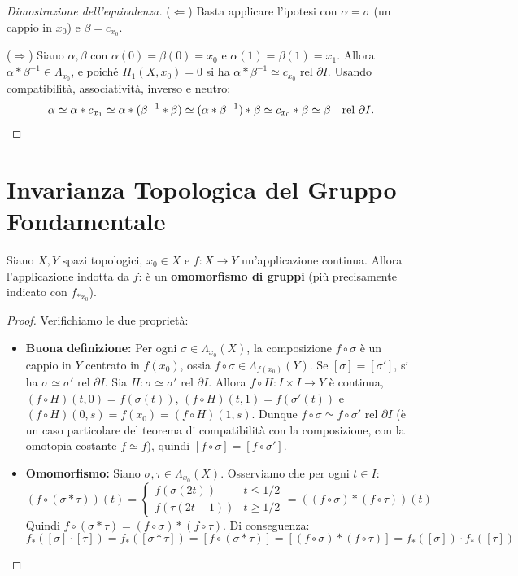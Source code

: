 \begin{proof}[Dimostrazione dell'equivalenza]
($\Leftarrow$) Basta applicare l'ipotesi con $\alpha = \sigma$ (un cappio in $x_0$) e $\beta = c_{x_0}$.

($\Rightarrow$) Siano $\alpha, \beta$ con $\alpha(0) = \beta(0) = x_0$ e $\alpha(1) = \beta(1) = x_1$. Allora $\alpha * \beta^{-1} \in \Lambda_{x_0}$, e poich\'e $\Pi_1(X, x_0) = 0$ si ha $\alpha * \beta^{-1} \simeq c_{x_0}$ rel $\partial I$. Usando compatibilit\`a, associativit\`a, inverso e neutro:
\[
\alpha \simeq \alpha * c_{x_1} \simeq \alpha * (\beta^{-1} * \beta) \simeq (\alpha * \beta^{-1}) * \beta \simeq c_{x_0} * \beta \simeq \beta \quad \text{rel } \partial I. \qedhere
\]
\end{proof}

\section{Invarianza Topologica del Gruppo Fondamentale}

\begin{prop}
Siano $X, Y$ spazi topologici, $x_0 \in X$ e $f: X \to Y$ un'applicazione continua.
Allora l'applicazione indotta da $f$:
è un \textbf{omomorfismo di gruppi} (più precisamente indicato con $f_{*x_0}$).
\end{prop}

\begin{proof}
Verifichiamo le due proprietà:
\begin{itemize}
    \item \textbf{Buona definizione:} Per ogni $\sigma \in \Lambda_{x_0}(X)$, la composizione $f \circ \sigma$ è un cappio in $Y$ centrato in $f(x_0)$, ossia $f \circ \sigma \in \Lambda_{f(x_0)}(Y)$.
    Se $[\sigma] = [\sigma']$, si ha $\sigma \simeq \sigma' \text{ rel } \partial I$. Sia $H: \sigma \simeq \sigma' \text{ rel } \partial I$. Allora $f \circ H: I \times I \to Y$ \`e continua, $(f\circ H)(t,0) = f(\sigma(t))$, $(f \circ H)(t,1) = f(\sigma'(t))$ e $(f \circ H)(0,s) = f(x_0) = (f\circ H)(1,s)$. Dunque $f \circ \sigma \simeq f \circ \sigma' \text{ rel } \partial I$ (\`e un caso particolare del teorema di compatibilit\`a con la composizione, con la omotopia costante $f \simeq f$), quindi $[f \circ \sigma] = [f \circ \sigma']$.

    \item \textbf{Omomorfismo:} Siano $\sigma, \tau \in \Lambda_{x_0}(X)$. Osserviamo che per ogni $t \in I$:
    \[
    (f \circ (\sigma * \tau))(t) = 
    \begin{cases}
        f(\sigma(2t)) & t \leqslant 1/2 \\
        f(\tau(2t-1)) & t \geqslant 1/2
    \end{cases}
    = ((f \circ \sigma) * (f \circ \tau))(t)
    \]
    Quindi $f \circ (\sigma * \tau) = (f \circ \sigma) * (f \circ \tau)$. Di conseguenza:
    \[
    f_*([\sigma] \cdot [\tau]) = f_*([\sigma * \tau]) = [f \circ (\sigma * \tau)] = [(f \circ \sigma) * (f \circ \tau)] = f_*([\sigma]) \cdot f_*([\tau])
    \]
\end{itemize}
\end{proof}

